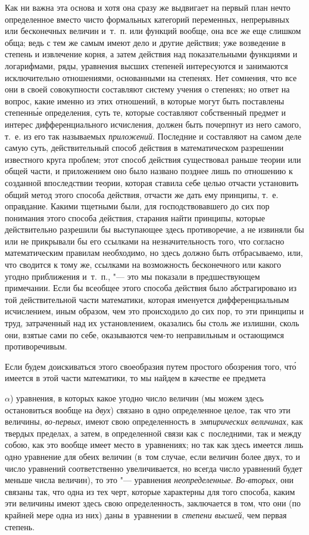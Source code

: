 Как ни важна эта основа и хотя она сразу же выдвигает на первый план нечто
определенное вместо чисто формальных категорий переменных, непрерывных или
бесконечных величин и~т.~п. или функций вообще, она все же еще слишком обща;
ведь с тем же самым имеют дело и другие действия; уже возведение в степень и
извлечение корня, а затем действия над показательными функциями и логарифмами,
ряды, уравнения высших степеней интересуются и занимаются исключительно
отношениями, основанными на степенях. Нет сомнения, что все они в своей
совокупности составляют систему учения о степенях; но ответ на вопрос, какие
именно из этих отношений, в которые могут быть поставлены степенн\'{ы}е
определения, суть те, которые составляют собственный предмет и интерес
дифференциального исчисления, должен быть почерпнут из него самого, т.~е. из
его так называемых {\em приложений}. Последние и составляют на самом деле самую
суть, действительный способ действия в математическом разрешении известного
круга проблем; этот способ действия существовал раньше теории или общей части,
и приложением оно было названо позднее лишь по отношению к созданной
впоследствии теории, которая ставила себе целью отчасти установить общий метод
этого способа действия, отчасти же дать ему принципы, т.~е. оправдание. Какими
тщетными были, для господствовавшего до сих пор понимания этого способа
действия, старания найти принципы, которые действительно разрешили бы
выступающее здесь противоречие, а не извиняли бы или не прикрывали бы его
ссылками на незначительность того, что согласно математическим правилам
необходимо, но здесь должно быть отбрасываемо, или, что сводится к тому же,
ссылками на возможность бесконечного или какого угодно приближения и~т.~п.,
"--- это мы показали в предшествующем примечании. Если бы всеобщее этого
способа действия было абстрагировано из той действительной части математики,
которая именуется дифференциальным исчислением, иным образом, чем это
происходило до сих пор, то эти принципы и труд, затраченный над их
установлением, оказались бы столь же излишни, сколь они, взятые сами по себе,
оказываются чем-то неправильным и остающимся противоречивым.

Если будем доискиваться этого своеобразия путем простого обозрения того,
чт\'{о} имеется в этой части математики, то мы найдем в качестве ее предмета

$\alpha$) уравнения, в которых какое угодно число величин (мы можем здесь
остановиться вообще на {\em двух}) связано в одно определенное целое, так что
эти величины, {\em во-первых}, имеют свою определенность
в~{\em эмпирических величинах}, как твердых пределах, а затем, в определенной
связи как с~последними, так и между собою, как это вообще имеет место
в~уравнениях; но так как здесь имеется лишь одно уравнение для обеих величин
(в~том случае, если величин более двух, то и число уравнений соответственно
увеличивается, но всегда число уравнений будет меньше числа величин), то это
"--- уравнения {\em неопределенные}. {\em Во-вторых}, они связаны так, что одна
из тех черт, которые характерны для того способа, каким эти величины имеют
здесь свою определенность, заключается в том, что они (по крайней мере одна из
них) даны в~уравнении в~{\em степени высшей}, чем первая степень.

